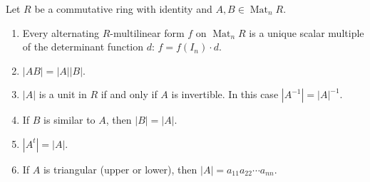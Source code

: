 Let $R$ be a commutative ring with identity and $A,B \in \operatorname{Mat}_n R$.
\begin{enumerate}
\item Every alternating $R$-multilinear form $f$ on $\operatorname{Mat}_n R$ is a unique scalar multiple of the determinant function $d$: $f = f(I_n) \cdot d$.
\item $|AB| = |A||B|$.
\item $|A|$ is a unit in $R$ if and only if $A$ is invertible. In this case $|A^{-1}| = |A|^{-1}$.
\item If $B$ is similar to $A$, then $|B| = |A|$.
\item $|A^t| = |A|$.
\item If $A$ is triangular (upper or lower), then $|A| = a_{11}a_{22} \cdots a_{nn}$.
\end{enumerate}
